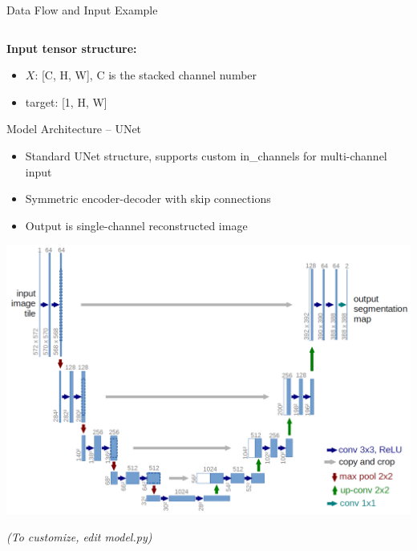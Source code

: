 \documentclass{beamer}
\begin{document}
\begin{frame}{Data Flow and Input Example}
\begin{columns}
\end{columns}
\vspace{0.5em}
\textbf{Input tensor structure:}
\begin{itemize}
    \item $X$: [C, H, W], C is the stacked channel number
    \item target: [1, H, W]
\end{itemize}
\end{frame}

\begin{frame}{Model Architecture -- UNet}
\begin{itemize}
    \item Standard UNet structure, supports custom in\_channels for multi-channel input
    \item Symmetric encoder-decoder with skip connections
    \item Output is single-channel reconstructed image
\end{itemize}
\begin{center}
\includegraphics[width=0.8\linewidth]{u-net-architecture.png}
\end{center}
\textit{(To customize, edit model.py)}
\end{frame}
\end{document}
